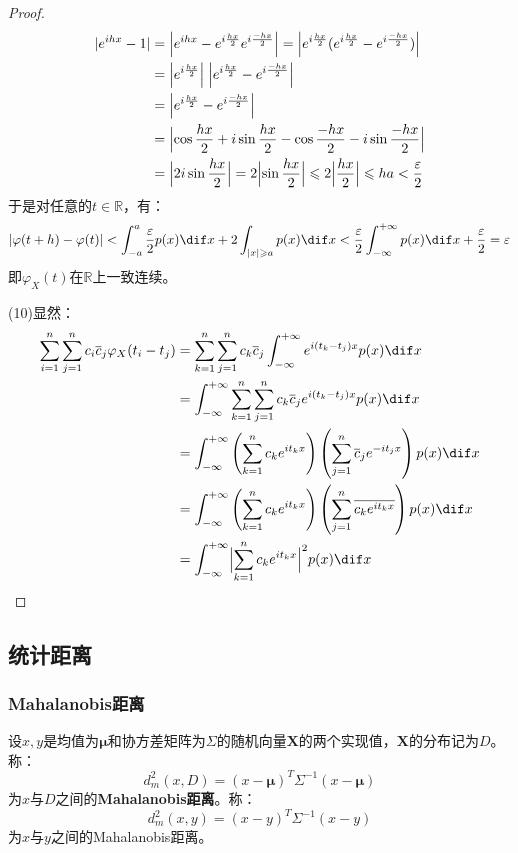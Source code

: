 \begin{proof}
\begin{align*}
		|e^{ihx}-1|
		&=\Bigl|e^{ihx}-e^{i\frac{hx}{2}}e^{i\frac{-hx}{2}}\Bigr|=\Bigl|e^{i\frac{hx}{2}}(e^{i\frac{hx}{2}}-e^{i\frac{-hx}{2}})\Bigr| \\
		&=\Bigl|e^{i\frac{hx}{2}}\Bigr|\;\Bigl|e^{i\frac{hx}{2}}-e^{i\frac{-hx}{2}}\Bigr| \\
		&=\Bigl|e^{i\frac{hx}{2}}-e^{i\frac{-hx}{2}}\Bigr| \\
		&=\Bigl|\cos\frac{hx}{2}+i\sin\frac{hx}{2}-\cos\frac{-hx}{2}-i\sin\frac{-hx}{2}\Bigr| \\
		&=\Bigl|2i\sin\frac{hx}{2}\Bigr|
		=2\Bigl|\sin\frac{hx}{2}\Bigr|\leqslant2\Bigl|\frac{hx}{2}\Bigr|\leqslant ha<\frac{\varepsilon}{2}
	\end{align*}
	于是对任意的$t\in\mathbb{R}$，有：
	\begin{equation*}
		|\varphi(t+h)-\varphi(t)|<\int_{-a}^{a}\frac{\varepsilon}{2}p(x)\dif x+2\int_{|x|\geqslant a}p(x)\dif x<\frac{\varepsilon}{2}\int_{-\infty}^{+\infty}p(x)\dif x+\frac{\varepsilon}{2}=\varepsilon
	\end{equation*}
	即$\varphi_X(t)$在$\mathbb{R}$上一致连续。\par
	(10)显然：
	\begin{align*}
		\sum_{i=1}^{n}\sum_{j=1}^{n}c_i\overline{c}_j\varphi_X(t_i-t_j)
		&=\sum_{k=1}^{n}\sum_{j=1}^{n}c_k\overline{c}_j\int_{-\infty}^{+\infty}e^{i(t_k-t_j)x}p(x)\dif x \\
		&=\int_{-\infty}^{+\infty}\sum_{k=1}^{n}\sum_{j=1}^{n}c_k\overline{c}_je^{i(t_k-t_j)x}p(x)\dif x \\
		&=\int_{-\infty}^{+\infty}\left(\sum_{k=1}^{n}c_ke^{it_kx}\right)\left(\sum_{j=1}^{n}\overline{c}_je^{-it_jx}\right)p(x) \dif x \\
		&=\int_{-\infty}^{+\infty}\left(\sum_{k=1}^{n}c_ke^{it_kx}\right)\left(\sum_{j=1}^{n}\overline{c_ke^{it_kx}}\right)p(x) \dif x \\
		&=\int_{-\infty}^{+\infty}\Bigl|\sum_{k=1}^{n}c_ke^{it_kx}\Bigr|^2p(x) \dif x\qedhere
	\end{align*}
\end{proof}

\subsection{统计距离}
\subsubsection{Mahalanobis距离}
\begin{definition}
	设$x,y$是均值为$\boldsymbol{\mu}$和协方差矩阵为$\Sigma$的随机向量$\mathbf{X}$的两个实现值，$\mathbf{X}$的分布记为$D$。称：
	\begin{equation*}
		d^2_m(x,D)=(x-\boldsymbol{\mu})^T\Sigma^{-1}(x-\boldsymbol{\mu})
	\end{equation*}
	为$x$与$D$之间的\textbf{Mahalanobis距离}。称：
	\begin{equation*}
		d^2_m(x,y)=(x-y)^T\Sigma^{-1}(x-y)
	\end{equation*}
	为$x$与$y$之间的Mahalanobis距离。
\end{definition}